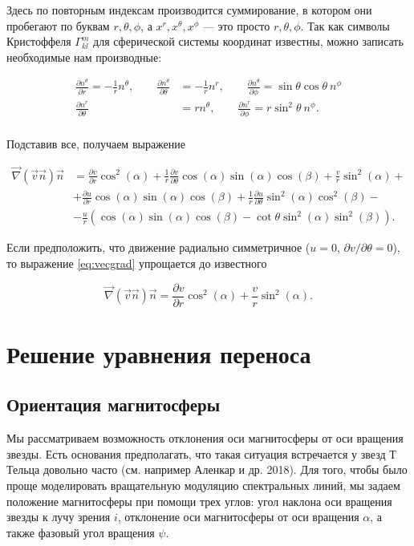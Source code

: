\documentclass{article}
\begin{document}
Здесь по повторным индексам производится суммирование, в котором они пробегают по буквам $r,\theta,\phi$, а $x^r, x^\theta, x^\phi$ --- это просто $r, \theta, \phi$. Так как символы Кристоффеля $\Gamma^m_{kl}$ для сферической системы координат известны, можно записать необходимые нам производные:

\[
\begin{aligned}
\frac{\partial n^\theta}{\partial r} = -\frac{1}{r}n^\theta, \qquad \frac{\partial n^\theta}{\partial \theta} &= -\frac{1}{r}n^r , \qquad \frac{\partial n^\theta}{\partial \phi} = \sin\theta\cos\theta\ n^\phi \\
\frac{\partial n^r}{\partial\theta} &= rn^\theta, \qquad \frac{\partial n^r}{\partial \phi} = r\sin^2\theta\ n^\phi. \\
\end{aligned}
\]

Подставив все, получаем выражение

\begin{align} \label{eq:vecgrad}
\vec{\nabla}(\vec{v}\vec{n})\vec{n} & = \frac{\partial v}{\partial r}\cos^2(\alpha) + \frac{1}{r}\frac{\partial v}{\partial \theta}\cos(\alpha)\sin(\alpha)\cos(\beta) + \frac{v}{r}\sin^2(\alpha) + \nonumber \\
& + \frac{\partial u}{\partial r} \cos(\alpha)\sin(\alpha)\cos(\beta) + \frac{1}{r}\frac{\partial u}{\partial \theta} \sin^2(\alpha)\cos^2(\beta) - \nonumber \\
& - \frac{u}{r}\left(\cos(\alpha)\sin(\alpha)\cos(\beta) - \cot\theta\sin^2(\alpha)\sin^2(\beta)\right).
\end{align}

Если предположить, что движение радиально симметричное ($u = 0$, $\partial v/\partial \theta = 0$), то выражение \eqref{eq:vecgrad} упрощается до известного

\[
\vec{\nabla}(\vec{v}\vec{n})\vec{n} = \frac{\partial v}{\partial r}\cos^2(\alpha) + \frac{v}{r}\sin^2(\alpha).
\] 

\section{Решение уравнения переноса}
\subsection{Ориентация магнитосферы}

Мы рассматриваем возможность отклонения оси магнитосферы от оси вращения звезды. Есть основания предполагать, что такая ситуация встречается у звезд Т Тельца довольно часто (см. например Аленкар и др. 2018). Для того, чтобы было проще моделировать вращательную модуляцию спектральных линий, мы задаем положение магнитосферы при помощи трех углов: угол наклона оси вращения звезды к лучу зрения $i$, отклонение оси магнитосферы от оси вращения $\alpha$, а также фазовый угол вращения $\psi$.
\end{document}
